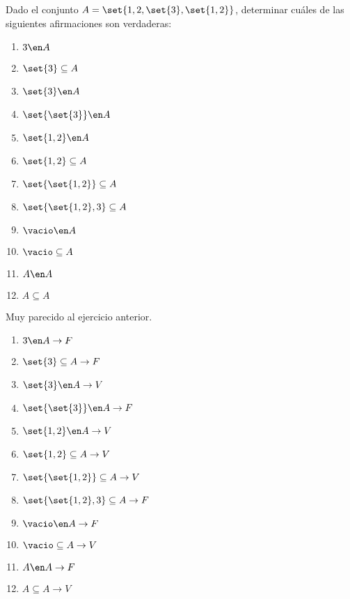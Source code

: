 \begin{enunciado}{\ejercicio}
  Dado el conjunto $A = \set{1,2,\set{3},\set{1,2}}$,
  determinar cuáles de las siguientes afirmaciones son verdaderas:
  \begin{multicols}{4}
    \begin{enumerate}[label=(\roman*)]
      \item $3 \en A         $
      \item $\set{3} \subseteq A $
      \item $\set{3} \en A    $
      \item $\set{\set{3}} \en A $
      \item $\set{1,2} \en A $
      \item $\set{1,2} \subseteq A  $
      \item $\set{\set{1,2}} \subseteq A  $
      \item $\set{\set{1,2}, 3} \subseteq A  $
      \item $\vacio \en A  $
      \item $\vacio \subseteq A  $
      \item $A \en A  $
      \item $A \subseteq A  $
    \end{enumerate}
  \end{multicols}
\end{enunciado}

Muy parecido al ejercicio anterior.

\begin{multicols}{3}
  \begin{enumerate}[label=(\roman*)]
    \item $3 \en A \to F  $

    \item $\set{3} \subseteq A \to F$

    \item $\set{3} \en A    \to V$

    \item $\set{\set{3}} \en A \to F$

    \item $\set{1,2} \en A \to V$

    \item $\set{1,2} \subseteq A \to V $

    \item $\set{\set{1,2}} \subseteq A \to V $

    \item $\set{\set{1,2}, 3} \subseteq A \to F$

    \item $\vacio \en A \to F $

    \item $\vacio \subseteq A \to V $

    \item $A \en A \to F $

    \item $A \subseteq A \to V $
  \end{enumerate}
\end{multicols}

\begin{aportes}
  \item {}
\end{aportes}
